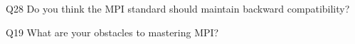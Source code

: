 \begin{description}%
\item{Q28} Do you think the MPI standard should maintain backward compatibility?%
\item{Q19} What are your obstacles to mastering MPI?%
\end{description}%
